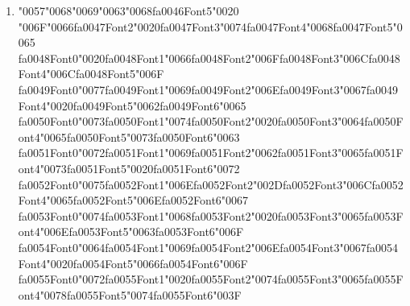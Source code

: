 \documentclass[11pt]{article}
\begin{document}
\begin{enumerate}[label=Q\arabic*., leftmargin=*]
\item {\char"0057}{\char"0068}{\char"0069}{\char"0063}{\char"0068}{\csname fa0046Font5\endcsname\char"0020} {\char"006F}{\char"0066}{\csname fa0047Font2\endcsname\char"0020}{\csname fa0047Font3\endcsname\char"0074}{\csname fa0047Font4\endcsname\char"0068}{\csname fa0047Font5\endcsname\char"0065} {\csname fa0048Font0\endcsname\char"0020}{\csname fa0048Font1\endcsname\char"0066}{\csname fa0048Font2\endcsname\char"006F}{\csname fa0048Font3\endcsname\char"006C}{\csname fa0048Font4\endcsname\char"006C}{\csname fa0048Font5\endcsname\char"006F} {\csname fa0049Font0\endcsname\char"0077}{\csname fa0049Font1\endcsname\char"0069}{\csname fa0049Font2\endcsname\char"006E}{\csname fa0049Font3\endcsname\char"0067}{\csname fa0049Font4\endcsname\char"0020}{\csname fa0049Font5\endcsname\char"0062}{\csname fa0049Font6\endcsname\char"0065} {\csname fa0050Font0\endcsname\char"0073}{\csname fa0050Font1\endcsname\char"0074}{\csname fa0050Font2\endcsname\char"0020}{\csname fa0050Font3\endcsname\char"0064}{\csname fa0050Font4\endcsname\char"0065}{\csname fa0050Font5\endcsname\char"0073}{\csname fa0050Font6\endcsname\char"0063} {\csname fa0051Font0\endcsname\char"0072}{\csname fa0051Font1\endcsname\char"0069}{\csname fa0051Font2\endcsname\char"0062}{\csname fa0051Font3\endcsname\char"0065}{\csname fa0051Font4\endcsname\char"0073}{\csname fa0051Font5\endcsname\char"0020}{\csname fa0051Font6\endcsname\char"0072} {\csname fa0052Font0\endcsname\char"0075}{\csname fa0052Font1\endcsname\char"006E}{\csname fa0052Font2\endcsname\char"002D}{\csname fa0052Font3\endcsname\char"006C}{\csname fa0052Font4\endcsname\char"0065}{\csname fa0052Font5\endcsname\char"006E}{\csname fa0052Font6\endcsname\char"0067} {\csname fa0053Font0\endcsname\char"0074}{\csname fa0053Font1\endcsname\char"0068}{\csname fa0053Font2\endcsname\char"0020}{\csname fa0053Font3\endcsname\char"0065}{\csname fa0053Font4\endcsname\char"006E}{\csname fa0053Font5\endcsname\char"0063}{\csname fa0053Font6\endcsname\char"006F} {\csname fa0054Font0\endcsname\char"0064}{\csname fa0054Font1\endcsname\char"0069}{\csname fa0054Font2\endcsname\char"006E}{\csname fa0054Font3\endcsname\char"0067}{\csname fa0054Font4\endcsname\char"0020}{\csname fa0054Font5\endcsname\char"0066}{\csname fa0054Font6\endcsname\char"006F} {\csname fa0055Font0\endcsname\char"0072}{\csname fa0055Font1\endcsname\char"0020}{\csname fa0055Font2\endcsname\char"0074}{\csname fa0055Font3\endcsname\char"0065}{\csname fa0055Font4\endcsname\char"0078}{\csname fa0055Font5\endcsname\char"0074}{\csname fa0055Font6\endcsname\char"003F}


\end{enumerate}
\end{document}
